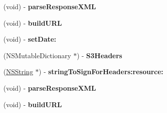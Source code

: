 \begin{DoxyCompactItemize}
\item 
\hypertarget{interface_a_s_i_s3_request_a537b485990a0b0b1cf22d122439b89e1}{
(void) -\/ {\bfseries parse\-Response\-X\-M\-L}}
\label{interface_a_s_i_s3_request_a537b485990a0b0b1cf22d122439b89e1}

\item 
\hypertarget{interface_a_s_i_s3_request_ace59aaf9a74564868fc1f426b363e5bb}{
(void) -\/ {\bfseries build\-U\-R\-L}}
\label{interface_a_s_i_s3_request_ace59aaf9a74564868fc1f426b363e5bb}

\item 
\hypertarget{interface_a_s_i_s3_request_a3eb32c464e0663e896f97338e45fcbcc}{
(void) -\/ {\bfseries set\-Date\-:}}
\label{interface_a_s_i_s3_request_a3eb32c464e0663e896f97338e45fcbcc}

\item 
\hypertarget{interface_a_s_i_s3_request_ae9241f3e6890675b37ebcc612a4112b3}{
(\-N\-S\-Mutable\-Dictionary $\ast$) -\/ {\bfseries \-S3\-Headers}}
\label{interface_a_s_i_s3_request_ae9241f3e6890675b37ebcc612a4112b3}

\item 
\hypertarget{interface_a_s_i_s3_request_a6186d54d09b61de7f1929707a983a95b}{
(\hyperlink{class_n_s_string}{\-N\-S\-String} $\ast$) -\/ {\bfseries string\-To\-Sign\-For\-Headers\-:resource\-:}}
\label{interface_a_s_i_s3_request_a6186d54d09b61de7f1929707a983a95b}

\item 
\hypertarget{interface_a_s_i_s3_request_a537b485990a0b0b1cf22d122439b89e1}{
(void) -\/ {\bfseries parse\-Response\-X\-M\-L}}
\label{interface_a_s_i_s3_request_a537b485990a0b0b1cf22d122439b89e1}

\item 
\hypertarget{interface_a_s_i_s3_request_ace59aaf9a74564868fc1f426b363e5bb}{
(void) -\/ {\bfseries build\-U\-R\-L}}
\label{interface_a_s_i_s3_request_ace59aaf9a74564868fc1f426b363e5bb}

\end{DoxyCompactItemize}
